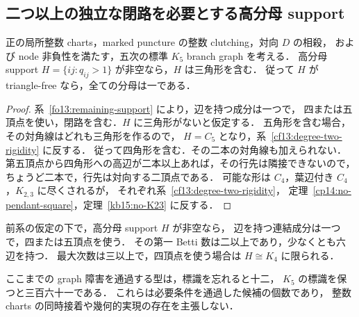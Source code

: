 \subsection{二つ以上の独立な閉路を必要とする高分母 support}
\label{sf16:section}

\begin{corollary}[三角形の必要性]
\label{sf16:triangle-required}
正の局所整数 charts，marked puncture の整数 clutching，対向 $D$ の相殺，
および node 非負性を満たす，五次の標準 $K_5$ branch graph を考える．
高分母 support $H=\{ij:q_{ij}>1\}$ が非空なら，$H$ は三角形を含む．
従って $H$ が triangle-free なら，全ての分母は一である．
\end{corollary}

\begin{proof}
系~\ref{fo13:remaining-support} により，辺を持つ成分は一つで，
四または五頂点を使い，閉路を含む．$H$ に三角形がないと仮定する．
五角形を含む場合，その対角線はどれも三角形を作るので，
$H=C_5$ となり，系~\ref{cf13:degree-two-rigidity} に反する．
従って四角形を含む．その二本の対角線も加えられない．
第五頂点から四角形への高辺が二本以上あれば，その行先は隣接できないので，
ちょうど二本で，行先は対向する二頂点である．
可能な形は $C_4$，葉辺付き $C_4$，$K_{2,3}$ に尽くされるが，
それぞれ系~\ref{cf13:degree-two-rigidity}，
定理~\ref{cp14:no-pendant-square}，定理~\ref{kb15:no-K23} に反する．
\end{proof}

\begin{corollary}
\label{sf16:remaining-support}
前系の仮定の下で，高分母 support $H$ が非空なら，
辺を持つ連結成分は一つで，四または五頂点を使う．
その第一 Betti 数は二以上であり，少なくとも六辺を持つ．
最大次数は三以上で，四頂点を使う場合は $H\cong K_4$ に限られる．

ここまでの graph 障害を通過する型は，標識を忘れると十二，
$K_5$ の標識を保つと三百六十一である．
これらは必要条件を通過した候補の個数であり，
整数 charts の同時接着や幾何的実現の存在を主張しない．
\end{corollary}

